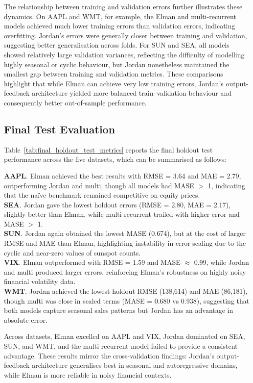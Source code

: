 \documentclass[conference]{IEEEtran}
\begin{document}
The relationship between training and validation errors further illustrates these dynamics. On AAPL and WMT, for example, the Elman and multi-recurrent models achieved much lower training errors than validation errors, indicating overfitting. Jordan’s errors were generally closer between training and validation, suggesting better generalisation across folds. For SUN and SEA, all models showed relatively large validation variances, reflecting the difficulty of modelling highly seasonal or cyclic behaviour, but Jordan nonetheless maintained the smallest gap between training and validation metrics. These comparisons highlight that while Elman can achieve very low training errors, Jordan’s output-feedback architecture yielded more balanced train–validation behaviour and consequently better out-of-sample performance.

\subsection{Final Test Evaluation}
Table~\ref{tab:final_holdout_test_metrics} reports the final holdout test performance across the five datasets, which can be summarised as follows:  
\smallskip

\noindent\textbf{AAPL}. Elman achieved the best results with RMSE = 3.64 and MAE = 2.79, outperforming Jordan and multi, though all models had MASE $>$ 1, indicating that the naïve benchmark remained competitive on equity prices.\\
\noindent\textbf{SEA}. Jordan gave the lowest holdout errors (RMSE = 2.80, MAE = 2.17), slightly better than Elman, while multi-recurrent trailed with higher error and MASE $>$ 1.  \\
\noindent\textbf{SUN}. Jordan again obtained the lowest MASE (0.674), but at the cost of larger RMSE and MAE than Elman, highlighting instability in error scaling due to the cyclic and near-zero values of sunspot counts.  \\
\noindent\textbf{VIX}. Elman outperformed with RMSE = 1.59 and MASE $\approx$ 0.99, while Jordan and multi produced larger errors, reinforcing Elman’s robustness on highly noisy financial volatility data.  \\
\noindent\textbf{WMT}. Jordan achieved the lowest holdout RMSE (138,614) and MAE (86,181), though multi was close in scaled terms (MASE = 0.680 vs 0.938), suggesting that both models capture seasonal sales patterns but Jordan has an advantage in absolute error.  

Across datasets, Elman excelled on AAPL and VIX, Jordan dominated on SEA, SUN, and WMT, and the multi-recurrent model failed to provide a consistent advantage. These results mirror the cross-validation findings: Jordan’s output-feedback architecture generalises best in seasonal and autoregressive domains, while Elman is more reliable in noisy financial contexts.
\end{document}
